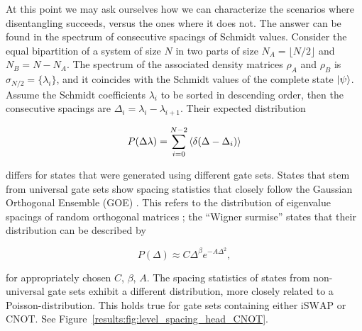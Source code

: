 \documentclass[reprint,amsmath,amssymb,aps,prb,nofootinbib]{revtex4-2}
\begin{document}
    At this point we may ask ourselves how we can characterize the scenarios where disentangling succeeds, versus the
    ones where it does not. The answer can be found in the spectrum of consecutive spacings of Schmidt values. Consider
    the equal bipartition of a system of size $N$ in two parts of size $N_A = \lfloor N/2\rfloor$ and $N_B=N-N_A$. The
    spectrum of the associated density matrices $\rho_A$ and $\rho_B$ is $\sigma_{N/2}=\{\lambda_i\}$, and it coincides
    with the Schmidt values of the complete state $\ket{\psi}$. Assume the Schmidt coefficients $\lambda_i$ to be sorted
    in descending order, then the consecutive spacings are $\Delta_i = \lambda_i-\lambda_{i+1}$. Their expected distribution

    \begin{equation}
        P(\Delta\lambda) = \sum_{i=0}^{N-2}\braket{\delta(\Delta-\Delta_i)}
        \label{results:eq:spacing_distribution}
    \end{equation}

    differs for states that were generated using different gate sets. States that stem from universal gate sets show
    spacing statistics that closely follow the Gaussian Orthogonal Ensemble (GOE) \cite{Chamon:2014:EmergentIrreversibility}.
    This refers to the distribution of eigenvalue spacings of random orthogonal matrices \cite{Mehta:2003:RandomMatrices};
    the ``Wigner surmise'' states that their distribution can be described by \cite{Guler:2007:RandomMatrixTheoryIntrodution}

    \begin{equation}
        P(\Delta) \approx C\Delta^{\beta}e^{-A\Delta^2},
        \label{results:eq:wigner_surmise}
    \end{equation}

    for appropriately chosen $C$, $\beta$, $A$. The spacing statistics of states from non-universal gate sets exhibit
    a different distribution, more closely related to a Poisson-distribution. This holds true for gate sets containing
    either $\text{iSWAP}$ or $\text{CNOT}$. See Figure~\ref{results:fig:level_spacing_head_CNOT}.
\end{document}
